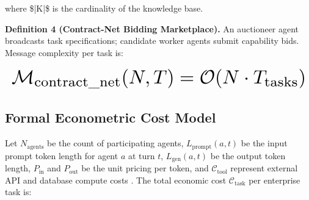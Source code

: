\documentclass[10pt,journal,compsoc,twocolumn]{IEEEtran}
\begin{document}
where \$|K|\$ is the cardinality of the knowledge base.

\textbf{Definition 4 (Contract-Net Bidding Marketplace).} An auctioneer agent broadcasts task specifications; candidate worker agents submit capability bids. Message complexity per task is:


























\begin{equation}
\resizebox{\columnwidth}{!}{$\displaystyle
\begin{aligned}
\mathcal{M}_{\text{contract\_net}}(N, T) = \mathcal{O}(N \cdot T_{\text{tasks}})
\end{aligned}
$}
\end{equation}





























\subsection{Formal Econometric Cost Model}


Let $N_{\text{agents}}$ be the count of participating agents, $L_{\text{prompt}}(a, t)$ be the input prompt token length for agent $a$ at turn $t$, $L_{\text{gen}}(a, t)$ be the output token length, $P_{\text{in}}$ and $P_{\text{out}}$ be the unit pricing per token, and $\mathcal{C}_{\text{tool}}$ represent external API and database compute costs \cite{arxiv_2406_00584}. The total economic cost $\mathcal{C}_{\text{task}}$ per enterprise task is:
\end{document}
